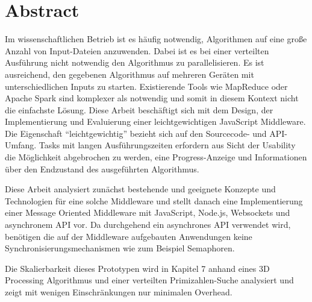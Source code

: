 \chapter{Abstract}

Im wissenschaftlichen Betrieb ist es häufig notwendig, Algorithmen auf eine große Anzahl von Input-Dateien anzuwenden.
Dabei ist es bei einer verteilten Ausführung nicht notwendig den Algorithmus zu parallelisieren.
Es ist ausreichend, den gegebenen Algorithmus auf mehreren Geräten mit unterschiedlichen Inputs zu starten.
Existierende Tools wie MapReduce oder Apache Spark sind komplexer als notwendig und somit in diesem Kontext nicht die einfachste Lösung.
Diese Arbeit beschäftigt sich mit dem Design, der Implementierung und Evaluierung einer leichtgewichtigen JavaScript Middleware.
Die Eigenschaft “leichtgewichtig” bezieht sich auf den Sourcecode- und API-Umfang.
Tasks mit langen Ausführungszeiten erfordern aus Sicht der Usability die Möglichkeit abgebrochen zu werden, eine Progress-Anzeige und Informationen über den Endzustand des ausgeführten Algorithmus.

Diese Arbeit analysiert zunächst bestehende und geeignete Konzepte und Technologien für eine solche Middleware und stellt danach eine Implementierung einer Message Oriented Middleware mit JavaScript, Node.js, Websockets und asynchronem API vor.
Da durchgehend ein asynchrones API verwendet wird, benötigen die auf der Middleware aufgebauten Anwendungen keine Synchronisierungsmechanismen wie zum Beispiel Semaphoren.

Die Skalierbarkeit dieses Prototypen wird in Kapitel 7 anhand eines 3D Processing Algorithmus und einer verteilten Primizahlen-Suche analysiert und zeigt mit wenigen Einschränkungen nur minimalen Overhead.
